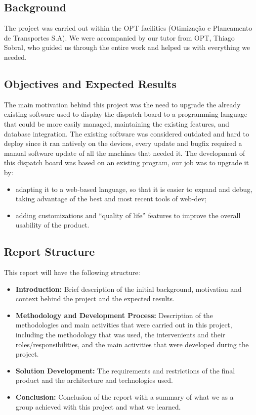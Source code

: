 \documentclass[10pt]{article}
\begin{document}
    \subsection{Background}
    The project was carried out within the OPT facilities (Otimização e Planeamento de Transportes S.A). We were accompanied by our tutor from OPT, Thiago Sobral, who guided us through the entire work and helped us with everything we needed.

    \subsection{Objectives and Expected Results}
        The main motivation behind this project was the need to upgrade the already existing software used to display the dispatch board to a programming language that could be more easily managed, maintaining the existing features, and database integration.
        The existing software was considered outdated and hard to deploy since it ran natively on the devices, every update and bugfix required a manual software update of all the machines that needed it.
        The development of this dispatch board was based on an existing program, our job was to upgrade it by:
        \begin{itemize}
            \item adapting it to a web-based language, so that it is easier to expand and debug, taking advantage of the best and most recent tools of web-dev;
            \item adding customizations and “quality of life” features to improve the overall usability of the product.
        \end{itemize}

    \subsection{Report Structure}
        This report will have the following structure:
        \begin{itemize}
            \item     \textbf{Introduction:} Brief description of the initial background, motivation and context behind the project and the expected results.
            \item     \textbf{Methodology and Development Process:} Description of the methodologies and main activities that were carried out in this project, including the methodology that was used, the intervenients and their roles/responsibilities, and the main activities that were developed during the project.
            \item     \textbf{Solution Development:} The requirements and restrictions of the final product and the architecture and technologies used.
            \item     \textbf{Conclusion:} Conclusion of the report with a summary of what we as a group achieved with this project and what we learned.
        \end{itemize}
\end{document}
